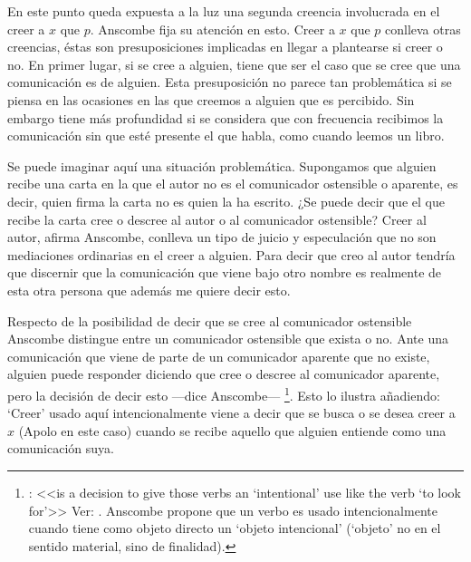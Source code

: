 En este punto queda expuesta a la luz una segunda creencia involucrada en el creer a $x$ que $p$. Anscombe fija su atención en esto. Creer a $x$ que $p$ conlleva otras creencias, éstas son presuposiciones implicadas en llegar a plantearse si creer o no. En primer lugar, si se cree a alguien, tiene que ser el caso que se cree que una comunicación es de alguien\autocite[Cf.~][6]{anscombe2008faith:tobelieve}. Esta presuposición no parece tan problemática si se piensa en las ocasiones en las que creemos a alguien que es percibido. Sin embargo tiene más profundidad si se considera que con frecuencia recibimos la comunicación sin que esté presente el que habla, como cuando leemos un libro\autocite[Cf.~][5]{anscombe2008faith:tobelieve}.

Se puede imaginar aquí una situación problemática. Supongamos que alguien recibe una carta en la que el autor no es el comunicador ostensible o aparente, es decir, quien firma la carta no es quien la ha escrito. ¿Se puede decir que el que recibe la carta cree o descree al autor o al comunicador ostensible? Creer al autor, afirma Anscombe, conlleva un tipo de juicio y especulación que no son mediaciones ordinarias en el creer a alguien\autocite[Cf.~][7]{anscombe2008faith:tobelieve}. Para decir que creo al autor tendría que discernir que la comunicación que viene bajo otro nombre es realmente de esta otra persona que además me quiere decir esto.

Respecto de la posibilidad de decir que se cree al comunicador ostensible Anscombe distingue entre un comunicador ostensible que exista o no. Ante una comunicación que viene de parte de un comunicador aparente que no existe, alguien puede responder diciendo que cree o descree al comunicador aparente, pero la decisión de decir esto ---dice Anscombe--- \footnote{\cite[7]{anscombe2008faith:tobelieve}: <<is a decision to give those verbs an `intentional' use like the verb `to look for'>> Ver: \cite{anscombe1981metaphysics:intsens}. Anscombe propone que un verbo es usado intencionalmente cuando tiene como objeto directo un `objeto intencional' (`objeto' no en el sentido material, sino de finalidad).}. Esto lo ilustra añadiendo:  `Creer' usado aquí intencionalmente viene a decir que se busca o se desea creer a $x$ (Apolo en este caso) cuando se recibe aquello que alguien entiende como una comunicación suya.


